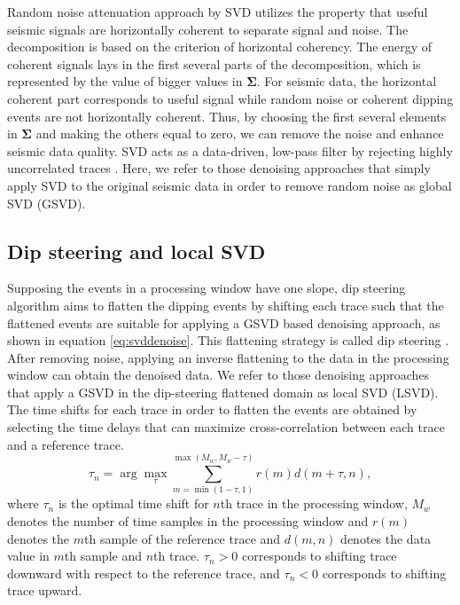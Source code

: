 Random noise attenuation approach by SVD utilizes the property that useful seismic signals are horizontally coherent to separate signal and noise. %
The decomposition is based on the criterion of horizontal coherency. The energy of coherent signals lays in the first several parts of the decomposition, which is represented by the value of bigger values in $\mathbf{\Sigma}$. For seismic data, the horizontal coherent part corresponds to useful signal while random noise or coherent dipping events are not horizontally coherent. Thus, by choosing the first several elements in $\mathbf{\Sigma}$ and making the others equal to zero, we can remove the noise and enhance seismic data quality. SVD acts as a data-driven, low-pass filter by rejecting highly uncorrelated traces \cite[]{bekara2007}. Here, we refer to those denoising approaches that simply apply SVD to the original seismic data in order to remove random noise as global SVD (GSVD).

\subsection{Dip steering and local SVD}
Supposing the events in a processing window have one slope, dip steering algorithm aims to flatten the dipping events by shifting each trace such that the flattened events are suitable for applying a GSVD based denoising approach, as shown in equation \ref{eq:svddenoise}. This flattening strategy is called dip steering \cite[]{bekara2007}. After removing noise, applying an inverse flattening to the data in the processing window can obtain the denoised data. We refer to those denoising approaches that apply a GSVD in the dip-steering flattened domain as local SVD (LSVD).
The time shifts for each trace in order to flatten the events are obtained by selecting the time delays that can maximize cross-correlation between each trace and a reference trace.  
\begin{equation}
\label{eq:steer}
\tau_n = \arg\max_{\tau} \sum_{m=\min(1-\tau,1)}^{\max(M_w,M_w-\tau)} r(m)d(m+\tau,n),
\end{equation}
where $\tau_n$ is the optimal time shift for $n$th trace in the processing window, $M_w$ denotes the number of time samples in the processing window and $r(m)$ denotes the $m$th sample of the reference trace and $d(m,n)$ denotes the data value in $m$th sample and $n$th trace.
$\tau_n>0$ corresponds to shifting trace downward with respect to the reference trace, and $\tau_n<0$ corresponds to shifting trace upward.

